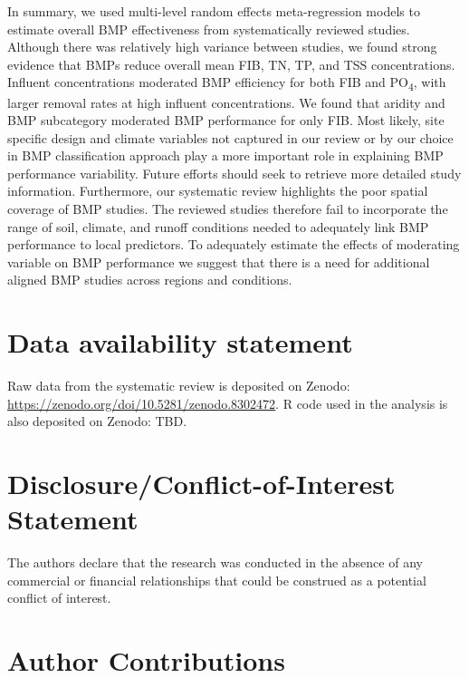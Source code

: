 \documentclass[utf8]{FrontiersinHarvard}
\begin{document}
In summary, we used multi-level random effects meta-regression models to estimate overall BMP effectiveness from systematically reviewed studies.
Although there was relatively high variance between studies, we found strong evidence that BMPs reduce overall mean FIB, TN, TP, and TSS concentrations.
Influent concentrations moderated BMP efficiency for both FIB and PO\textsubscript{4}, with larger removal rates at high influent concentrations.
We found that aridity and BMP subcategory moderated BMP performance for only FIB.
Most likely, site specific design and climate variables not captured in our review or by our choice in BMP classification approach play a more important role in explaining BMP performance variability.
Future efforts should seek to retrieve more detailed study information.
Furthermore, our systematic review highlights the poor spatial coverage of BMP studies.
The reviewed studies therefore fail to incorporate the range of soil, climate, and runoff conditions needed to adequately link BMP performance to local predictors.
To adequately estimate the effects of moderating variable on BMP performance we suggest that there is a need for additional aligned BMP studies across regions and conditions.

\hypertarget{data-availability-statement}{%
\section*{Data availability statement}\label{data-availability-statement}}

Raw data from the systematic review is deposited on Zenodo: \url{https://zenodo.org/doi/10.5281/zenodo.8302472}.
R code used in the analysis is also deposited on Zenodo: TBD.

\hypertarget{disclosureconflict-of-interest-statement}{%
\section*{Disclosure/Conflict-of-Interest Statement}\label{disclosureconflict-of-interest-statement}}

The authors declare that the research was conducted in the absence of any
commercial or financial relationships that could be construed as a potential
conflict of interest.

\hypertarget{author-contributions}{%
\section*{Author Contributions}\label{author-contributions}}
\end{document}
